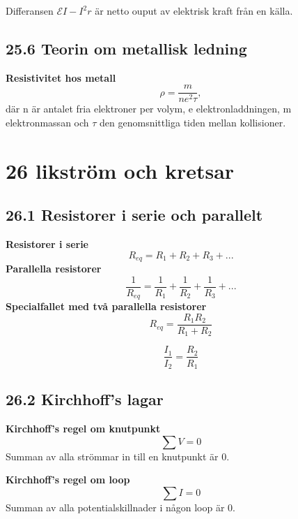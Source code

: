 \documentclass[a4paper]{article}
\begin{document}
Differansen $\mathcal{E}I - I^2r$ är netto ouput av elektrisk kraft från en källa.

\subsection*{25.6 Teorin om metallisk ledning}
\textbf{Resistivitet hos metall}
\begin{equation}
\rho = \dfrac{m}{ne^2\tau}, 
\end{equation}
där n är antalet fria elektroner per volym, e elektronladdningen, m elektronmassan och $\tau$ den genomsnittliga tiden mellan kollisioner.

\section*{26 likström och kretsar}

\subsection*{26.1 Resistorer i serie och parallelt}
\textbf{Resistorer i serie}
\begin{equation}
R_{eq} = R_1 + R_2 + R_3 + ...
\end{equation}
\textbf{Parallella resistorer}
\begin{equation}
\dfrac{1}{R_{eq}} = \dfrac{1}{R_{1}} + \dfrac{1}{R_{2}} + \dfrac{1}{R_{3}} + ... 
\end{equation}
\textbf{Specialfallet med två parallella resistorer}
\begin{equation}
R_{eq} = \frac{R_1R_2}{R_1+R_2}
\end{equation}

\begin{equation}
\dfrac{I_1}{I_2} = \dfrac{R_2}{R_1}
\end{equation}

\subsection*{26.2 Kirchhoff's lagar}
\textbf{Kirchhoff's regel om knutpunkt}
\begin{equation}
\sum V= 0
\end{equation}
Summan av alla strömmar in till en knutpunkt är 0.
\newline

\textbf{Kirchhoff's regel om loop}
\begin{equation}
\sum I = 0
\end{equation}
Summan av alla potentialskillnader i någon loop är 0.
\end{document}
